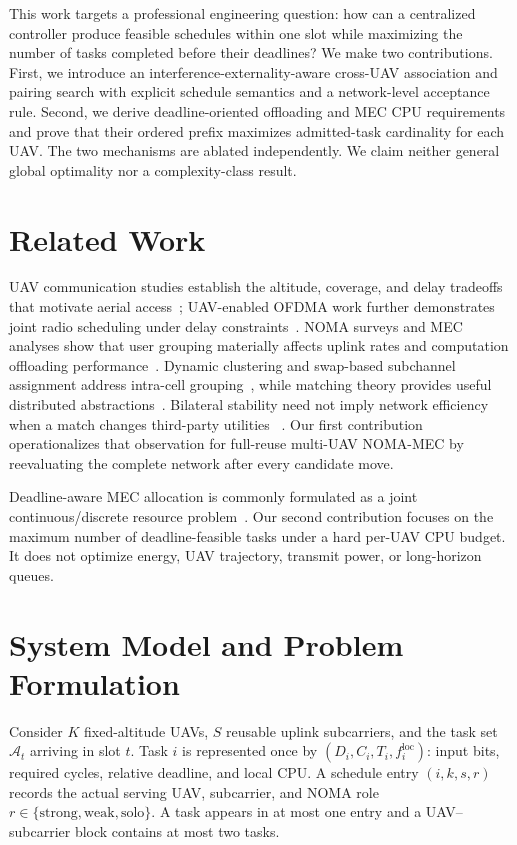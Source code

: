 \documentclass[journal]{IEEEtran}
\begin{document}
This work targets a professional engineering question: how can a centralized controller produce
feasible schedules within one slot while maximizing the number of tasks completed before their
deadlines? We make two contributions. First, we introduce an interference-externality-aware
cross-UAV association and pairing search with explicit schedule semantics and a network-level
acceptance rule. Second, we derive deadline-oriented offloading and MEC CPU requirements and prove
that their ordered prefix maximizes admitted-task cardinality for each UAV. The two mechanisms are
ablated independently. We claim neither general global optimality nor a complexity-class result.

\section{Related Work}
UAV communication studies establish the altitude, coverage, and delay tradeoffs that motivate
aerial access~\cite{zeng2016uav,alhourani2014optimal}; UAV-enabled OFDMA work further demonstrates
joint radio scheduling under delay constraints~\cite{wu2018joint}. NOMA surveys and MEC analyses
show that user grouping materially affects uplink rates and computation offloading
performance~\cite{ding2017survey,ding2019impact}. Dynamic clustering and swap-based subchannel
assignment address intra-cell grouping~\cite{ali2016dynamic,di2017sub}, while matching theory
provides useful distributed abstractions~\cite{bayat2016matching}. Bilateral stability need not
imply network efficiency when a match changes third-party utilities
~\cite{sasaki1996two,pycia2012stability}. Our first contribution operationalizes that observation
for full-reuse multi-UAV NOMA-MEC by reevaluating the complete network after every candidate move.

Deadline-aware MEC allocation is commonly formulated as a joint continuous/discrete resource
problem~\cite{mao2017survey,zhu2022multi}. Our second contribution focuses on the maximum number of
deadline-feasible tasks under a hard per-UAV CPU budget. It does not optimize energy, UAV
trajectory, transmit power, or long-horizon queues.

\section{System Model and Problem Formulation}
Consider $K$ fixed-altitude UAVs, $S$ reusable uplink subcarriers, and the task set
$\mathcal A_t$ arriving in slot $t$. Task $i$ is represented once by
$(D_i,C_i,T_i,f_i^{\mathrm{loc}})$: input bits, required cycles, relative deadline, and local CPU.
A schedule entry $(i,k,s,r)$ records the actual serving UAV, subcarrier, and NOMA role
$r\in\{\mathrm{strong},\mathrm{weak},\mathrm{solo}\}$. A task appears in at most one entry and a
UAV--subcarrier block contains at most two tasks.
\end{document}

